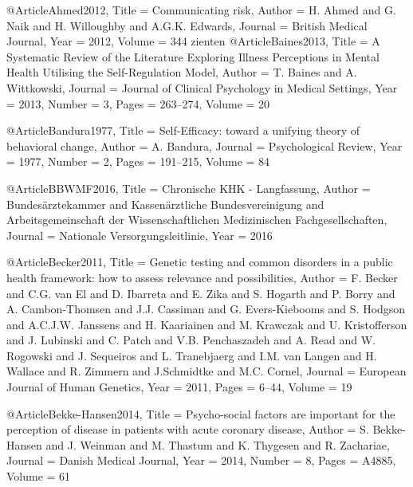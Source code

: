 

@Article{Ahmed2012,
  Title                    = {Communicating risk},
  Author                   = {H. Ahmed and G. Naik and H. Willoughby and A.G.K. Edwards},
  Journal                  = {British Medical Journal},
  Year                     = {2012},
  Volume                   = {344}
}
zienten
@Article{Baines2013,
  Title                    = {A Systematic Review of the Literature Exploring Illness Perceptions in Mental Health Utilising the Self-Regulation Model},
  Author                   = {T. Baines and A. Wittkowski},
  Journal                  = {Journal of Clinical Psychology in Medical Settings},
  Year                     = {2013},
  Number                   = {3},
  Pages                    = {263--274},
  Volume                   = {20}
}

@Article{Bandura1977,
  Title                    = {Self-Efficacy: toward a unifying theory of behavioral change},
  Author                   = {A. Bandura},
  Journal                  = {Psychological Review},
  Year                     = {1977},
  Number                   = {2},
  Pages                    = {191--215},
  Volume                   = {84}
}

@Article{BBWMF2016,
  Title                    = {Chronische KHK - Langfassung},
  Author                   = {{Bundesärztekammer} and {Kassenärztliche Bundesvereinigung} and {Arbeitsgemeinschaft der Wissenschaftlichen Medizinischen Fachgesellschaften}},
  Journal                  = {Nationale Versorgungsleitlinie},
  Year                     = {2016}
}

@Article{Becker2011,
  Title                    = {Genetic testing and common disorders in a public health framework: how to assess relevance and possibilities},
  Author                   = {F. Becker and C.G. van El and D. Ibarreta and E. Zika and S. Hogarth and P. Borry and A. Cambon-Thomsen and J.J. Cassiman and G. Evers-Kiebooms and S. Hodgson and A.C.J.W. Janssens and H. Kaariainen and M. Krawczak and U. Kristofferson and J. Lubinski and C. Patch and V.B. Penchaszadeh and A. Read and W. Rogowski and J. Sequeiros and L. Tranebjaerg and I.M. van Langen and H. Wallace and R. Zimmern and J.Schmidtke and M.C. Cornel},
  Journal                  = {European Journal of Human Genetics},
  Year                     = {2011},
  Pages                    = {6--44},
  Volume                   = {19}
}

@Article{Bekke-Hansen2014,
  Title                    = {Psycho-social factors are important for the perception of disease in patients with acute coronary disease},
  Author                   = {S. Bekke-Hansen and J. Weinman and M. Thastum and K. Thygesen and R. Zachariae},
  Journal                  = {Danish Medical Journal},
  Year                     = {2014},
  Number                   = {8},
  Pages                    = {A4885},
  Volume                   = {61}
}

